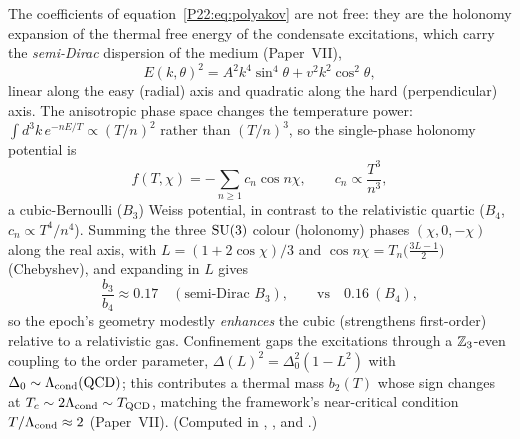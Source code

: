 The coefficients of equation~\eqref{P22:eq:polyakov} are not free: they
are the holonomy expansion of the thermal free energy of the condensate
excitations, which carry the \emph{semi-Dirac} dispersion of the medium
(Paper~VII),
\begin{equation}
  E(k,\theta)^2=A^2k^4\sin^4\theta+v^2k^2\cos^2\theta ,
  \label{P22:eq:semidirac}
\end{equation}
linear along the easy (radial) axis and quadratic along the hard
(perpendicular) axis. The anisotropic phase space changes the
temperature power: $\int\!d^3k\,e^{-nE/T}\propto(T/n)^{2}$ rather than
$(T/n)^3$, so the single-phase holonomy potential is
\begin{equation}
  f(T,\chi)=-\sum_{n\ge1}c_n\cos n\chi,\qquad c_n\propto\frac{T^3}{n^{3}} ,
  \label{P22:eq:weiss}
\end{equation}
a cubic-Bernoulli ($B_3$) Weiss potential, in contrast to the
relativistic quartic ($B_4$, $c_n\propto T^4/n^4$). Summing the three
$\mathrm{SU}(3)$ colour (holonomy) phases $(\chi,0,-\chi)$ along the real axis,
with $L=(1+2\cos\chi)/3$ and $\cos n\chi=T_n\!\big(\tfrac{3L-1}{2}\big)$
(Chebyshev), and expanding in $L$ gives
\begin{equation}
  \frac{b_3}{b_4}\approx0.17 \quad(\text{semi-Dirac }B_3),\qquad\text{vs}\quad 0.16\ (B_4),
  \label{P22:eq:b3b4}
\end{equation}
so the epoch's geometry modestly \emph{enhances} the cubic (strengthens
first-order) relative to a relativistic gas. Confinement gaps the
excitations through a $\mathbb{Z}_3$-even coupling to the order parameter,
$\Delta(L)^2=\Delta_0^2(1-L^2)$ with $\Delta_0\sim\Lambda_{\mathrm{cond}}(\mathrm{QCD})$;
this contributes a thermal mass $b_2(T)$ whose sign changes at
$T_c\sim2\Lambda_{\mathrm{cond}}\sim T_{\rm QCD}$, matching the framework's near-critical
condition $T/\Lambda_{\mathrm{cond}}\approx2$ (Paper~VII). (Computed in
,
, and
.)

